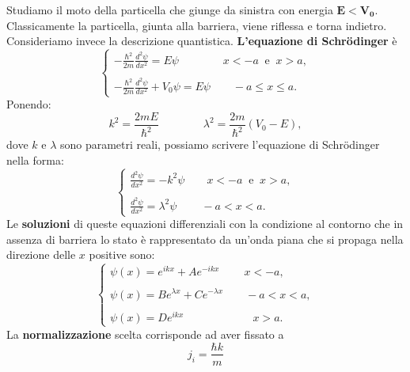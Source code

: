Studiamo il moto della particella che giunge da sinistra con energia $\mathbf{E<V_0}$. Classicamente la particella, giunta alla barriera, viene riflessa e torna indietro.\\
Consideriamo invece la descrizione quantistica. \textbf{L'equazione di Schr\"{o}dinger} è
\begin{equation}
\begin{cases}
\displaystyle{-\frac{\hbar ^2}{2m}\frac{d^2 \psi}{d x^2}=E \psi \qquad \qquad x <-a \ \textrm{ e }\  x>a,}\\
\\
\displaystyle{-\frac{\hbar ^2}{2m}\frac{d^2 \psi}{d x^2}+V_0 \psi=E \psi \qquad -a  \leq x \leq a.}
\end{cases}
\end{equation}
Ponendo:
\begin{equation}
k^2= \frac{2mE}{\hbar ^2} \qquad \qquad \lambda ^2= \frac{2m}{\hbar ^2} \left( V_0 - E \right),
\end{equation}
dove $k$ e $\lambda $ sono parametri reali, possiamo scrivere l'equazione di Schr\"{o}dinger nella forma:
\begin{equation}
\begin{cases}
\displaystyle{\frac{d^2 \psi}{d x^2}= -k ^2 \psi \qquad  x <-a \ \textrm{ e }\  x>a,}\\
\\
\displaystyle{\frac{d^2 \psi}{d x^2}= \lambda ^2 \psi \qquad 	\ -a  < x < a.}
\end{cases}
\end{equation}
Le \textbf{soluzioni} di queste equazioni differenziali con la condizione al contorno che in assenza di barriera lo stato è rappresentato da un'onda piana che si propaga nella direzione delle $x$ positive sono:
\begin{equation}
\begin{cases}
\displaystyle{\psi (x) = e^{ikx}+Ae^{-ikx} \qquad \ x <-a,}\\
\\
\displaystyle{\psi (x) = Be^{\lambda x}+Ce^{-\lambda x} \qquad  -a< x <a,}\\
\\
\displaystyle{\psi (x) = De^{ikx} \qquad \qquad \qquad \ x >a.}
\end{cases}
\end{equation}
La \textbf{normalizzazione} scelta corrisponde ad aver fissato a
\begin{equation}
j_i= \frac{\hbar k}{m}
\end{equation}
